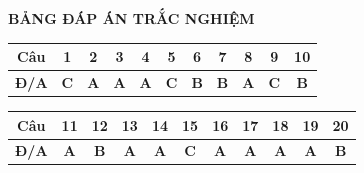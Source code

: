 
\vspace{0.3cm}
\noindent\begin{minipage}{\linewidth}
\begin{center}{\large\bfseries\color{red!80!black} BẢNG ĐÁP ÁN TRẮC NGHIỆM}\end{center}\smallskip
\begin{center}\begin{tabular}{|c|c|c|c|c|c|c|c|c|c|c|}\hline
\textbf{Câu} & 1 & 2 & 3 & 4 & 5 & 6 & 7 & 8 & 9 & 10 \\ \hline
\textbf{Đ/A} & \textbf{C} & \textbf{A} & \textbf{A} & \textbf{A} & \textbf{C} & \textbf{B} & \textbf{B} & \textbf{A} & \textbf{C} & \textbf{B} \\ \hline
\end{tabular}\end{center}\smallskip
\begin{center}\begin{tabular}{|c|c|c|c|c|c|c|c|c|c|c|}\hline
\textbf{Câu} & 11 & 12 & 13 & 14 & 15 & 16 & 17 & 18 & 19 & 20 \\ \hline
\textbf{Đ/A} & \textbf{A} & \textbf{B} & \textbf{A} & \textbf{A} & \textbf{C} & \textbf{A} & \textbf{A} & \textbf{A} & \textbf{A} & \textbf{B} \\ \hline
\end{tabular}\end{center}
\end{minipage}
